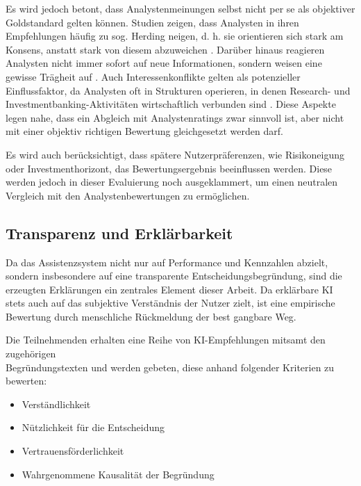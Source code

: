       Es wird jedoch betont, dass Analystenmeinungen selbst nicht per se als objektiver Goldstandard gelten können.
      Studien zeigen, dass Analysten in ihren Empfehlungen häufig zu sog. Herding neigen, d. h. sie orientieren sich stark am Konsens, anstatt stark von diesem abzuweichen \autocite{jegadeesh2007herd, michel2015analyst}.
      Darüber hinaus reagieren  Analysten nicht immer sofort auf neue Informationen, sondern weisen eine gewisse Trägheit auf \autocite{zhang2008analystresponsiveness}.
      Auch Interessenkonflikte gelten als potenzieller Einflussfaktor, da Analysten oft in Strukturen operieren, in denen Research- und Investmentbanking-Aktivitäten wirtschaftlich verbunden sind \autocite[S. 1-5]{iosco_report}.
      Diese Aspekte legen nahe, dass ein Abgleich mit Analystenratings zwar sinnvoll ist, aber nicht mit einer objektiv richtigen Bewertung gleichgesetzt werden darf.

      Es wird auch berücksichtigt, dass spätere Nutzerpräferenzen, wie Risikoneigung oder Investmenthorizont, das Bewertungsergebnis beeinflussen werden.
      Diese werden jedoch in dieser Evaluierung noch ausgeklammert, um einen neutralen Vergleich mit den Analystenbewertungen zu ermöglichen.

    \subsection{Transparenz und Erklärbarkeit}
    \label{sec:xai-eval}

      Da das Assistenzsystem nicht nur auf Performance und Kennzahlen abzielt, sondern insbesondere auf eine transparente Entscheidungsbegründung, sind die erzeugten Erklärungen ein zentrales Element dieser Arbeit.
      Da erklärbare \acs{KI} stets auch auf das subjektive Verständnis der Nutzer zielt, ist eine empirische Bewertung durch menschliche Rückmeldung der best gangbare Weg.

      Die Teilnehmenden erhalten eine Reihe von \acs{KI}-Empfehlungen mitsamt den zugehörigen \\
      Begründungstexten und werden gebeten, diese anhand folgender Kriterien zu bewerten:
      \begin{itemize}
        \item Verständlichkeit
        \item Nützlichkeit für die Entscheidung
        \item Vertrauensförderlichkeit
        \item Wahrgenommene Kausalität der Begründung
      \end{itemize}

